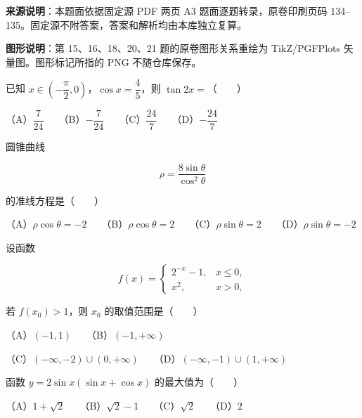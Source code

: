 


\begin{gktip}
\textbf{来源说明}：本题面依据固定源 PDF 两页 A3 题面逐题转录，原卷印刷页码 134–135。固定源不附答案，答案和解析均由本库独立复算。

\textbf{图形说明}：第 15、16、18、20、21 题的原卷图形关系重绘为 TikZ/PGFPlots 矢量图。图形标记所指的 PNG 不随仓库保存。
\end{gktip}


\begin{question}
已知 $x\in\left(-\dfrac\pi2,0\right)$，$\cos x=\dfrac45$，则 $\tan2x=$\mbox{（　　）}

（A）$\dfrac7{24}$　　（B）$-\dfrac7{24}$　　（C）$\dfrac{24}{7}$　　（D）$-\dfrac{24}{7}$

\end{question}
\begin{question}
圆锥曲线

\nopagebreak[4]
\[
\rho=\frac{8\sin\theta}{\cos^2\theta}
\]

的准线方程是\mbox{（　　）}

（A）$\rho\cos\theta=-2$　　（B）$\rho\cos\theta=2$　　（C）$\rho\sin\theta=2$　　（D）$\rho\sin\theta=-2$

\end{question}
\begin{question}
设函数

\nopagebreak[4]
\[
f(x)=
\begin{cases}
2^{-x}-1,&x\leqslant0,\\
x^2,&x>0,
\end{cases}
\]

若 $f(x_0)>1$，则 $x_0$ 的取值范围是\mbox{（　　）}

（A）$(-1,1)$　　（B）$(-1,+\infty)$

（C）$(-\infty,-2)\cup(0,+\infty)$　　（D）$(-\infty,-1)\cup(1,+\infty)$

\end{question}
\begin{question}
函数 $y=2\sin x(\sin x+\cos x)$ 的最大值为\mbox{（　　）}

（A）$1+\sqrt2$　　（B）$\sqrt2-1$　　（C）$\sqrt2$　　（D）$2$

\end{question}
